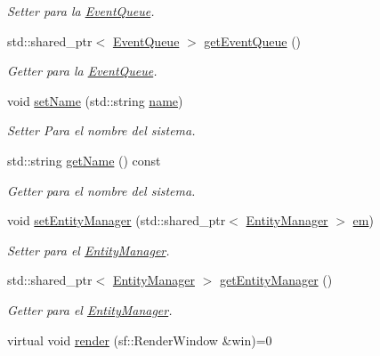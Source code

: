 \begin{DoxyCompactItemize}
\begin{DoxyCompactList}\small\item\em Setter para la \hyperlink{classant_1_1_event_queue}{Event\+Queue}. \end{DoxyCompactList}\item 
std\+::shared\+\_\+ptr$<$ \hyperlink{classant_1_1_event_queue}{Event\+Queue} $>$ \hyperlink{classant_1_1_system_ac3e2bbbdb622276d194ad3a687d8e4f1}{get\+Event\+Queue} ()
\begin{DoxyCompactList}\small\item\em Getter para la \hyperlink{classant_1_1_event_queue}{Event\+Queue}. \end{DoxyCompactList}\item 
void \hyperlink{classant_1_1_system_a231f9fc93b55ee67deb9597ae6be13ba}{set\+Name} (std\+::string \hyperlink{classant_1_1_system_a60b3c00a760a3b4947ab1f1fc534a5b2}{name})
\begin{DoxyCompactList}\small\item\em Setter Para el nombre del sistema. \end{DoxyCompactList}\item 
std\+::string \hyperlink{classant_1_1_system_a52a559b2c3ddbec5c846df1badd7f7f8}{get\+Name} () const 
\begin{DoxyCompactList}\small\item\em Getter para el nombre del sistema. \end{DoxyCompactList}\item 
void \hyperlink{classant_1_1_system_a1f983382d142ea697f1811f7f6f6ab17}{set\+Entity\+Manager} (std\+::shared\+\_\+ptr$<$ \hyperlink{classant_1_1_entity_manager}{Entity\+Manager} $>$ \hyperlink{classant_1_1_system_a5661d872ff769be150bd4e9a9552f6b9}{em})
\begin{DoxyCompactList}\small\item\em Setter para el \hyperlink{classant_1_1_entity_manager}{Entity\+Manager}. \end{DoxyCompactList}\item 
std\+::shared\+\_\+ptr$<$ \hyperlink{classant_1_1_entity_manager}{Entity\+Manager} $>$ \hyperlink{classant_1_1_system_adaad2087de7fc71924cfb5b134014b0a}{get\+Entity\+Manager} ()
\begin{DoxyCompactList}\small\item\em Getter para el \hyperlink{classant_1_1_entity_manager}{Entity\+Manager}. \end{DoxyCompactList}\item 
virtual void \hyperlink{classant_1_1_system_a30a815d199fea90e9d2f7167eb2bf86e}{render} (sf\+::\+Render\+Window \&win)=0

\end{DoxyCompactItemize}
